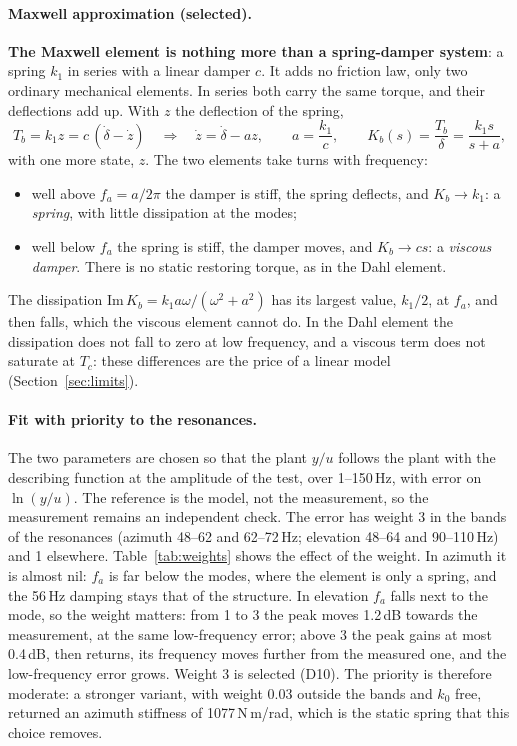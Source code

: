 \documentclass[10pt,a4paper]{article}
\numberwithin{equation}{section}
\begin{document}
\paragraph{Maxwell approximation (selected).} \textbf{The Maxwell element is nothing more than a spring-damper system}: a spring $k_1$ in series with a linear damper $c$. It adds no friction law, only two ordinary mechanical elements. In series both carry the same torque, and their deflections add up. With $z$ the deflection of the spring,
\begin{equation}
T_b=k_1z=c\,(\dot\delta-\dot z)\quad\Longrightarrow\quad\dot z=\dot\delta-az,\qquad a=\frac{k_1}{c},\qquad K_b(s)=\frac{T_b}{\delta}=\frac{k_1s}{s+a},
\end{equation}
with one more state, $z$. The two elements take turns with frequency:
\begin{itemize}
\item well above $f_a=a/2\pi$ the damper is stiff, the spring deflects, and $K_b\to k_1$: a \emph{spring}, with little dissipation at the modes;
\item well below $f_a$ the spring is stiff, the damper moves, and $K_b\to cs$: a \emph{viscous damper}. There is no static restoring torque, as in the Dahl element.
\end{itemize}
The dissipation $\mathrm{Im}\,K_b=k_1a\omega/(\omega^2+a^2)$ has its largest value, $k_1/2$, at $f_a$, and then falls, which the viscous element cannot do. In the Dahl element the dissipation does not fall to zero at low frequency, and a viscous term does not saturate at $T_c$: these differences are the price of a linear model (Section~\ref{sec:limits}).

\paragraph{Fit with priority to the resonances.} The two parameters are chosen so that the plant $y/u$ follows the plant with the describing function at the amplitude of the test, over 1--150\,Hz, with error on $\ln(y/u)$. The reference is the model, not the measurement, so the measurement remains an independent check. The error has weight 3 in the bands of the resonances (azimuth 48--62 and 62--72\,Hz; elevation 48--64 and 90--110\,Hz) and 1 elsewhere. Table~\ref{tab:weights} shows the effect of the weight. In azimuth it is almost nil: $f_a$ is far below the modes, where the element is only a spring, and the 56\,Hz damping stays that of the structure. In elevation $f_a$ falls next to the mode, so the weight matters: from 1 to 3 the peak moves 1.2\,dB towards the measurement, at the same low-frequency error; above 3 the peak gains at most 0.4\,dB, then returns, its frequency moves further from the measured one, and the low-frequency error grows. Weight 3 is selected (D10). The priority is therefore moderate: a stronger variant, with weight 0.03 outside the bands and $k_0$ free, returned an azimuth stiffness of 1077\,N\,m/rad, which is the static spring that this choice removes.
\end{document}

